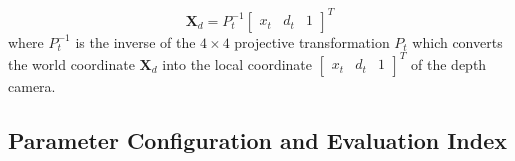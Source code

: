 \documentclass[preprint,10pt,5p,times,twocolumn]{elsarticle}
\begin{document}
\begin{equation}
\mathbf{X}_d = P^{-1}_t \begin{bmatrix} x_t & d_t & 1\end{bmatrix}^T
\end{equation}
where $P^{-1}_t$ is the inverse of the $4 \times 4$ projective transformation $P_t$ which converts the world coordinate $\mathbf{X}_d $ into the local coordinate $\begin{bmatrix} x_t & d_t & 1\end{bmatrix}^T$ of the depth camera.



\subsection{Parameter Configuration and Evaluation Index}
\label{chap:exp}
\end{document}
